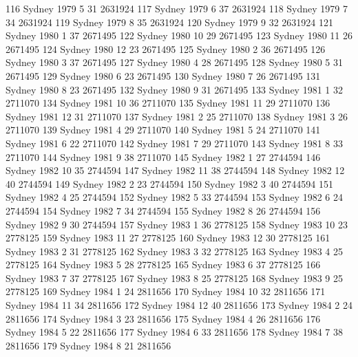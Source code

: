 \documentclass[a4paper]{article}                %
\begin{document}
\begin{Schunk}
\begin{Soutput}
116   Sydney  1979     5      31 2631924
117   Sydney  1979     6      37 2631924
118   Sydney  1979     7      34 2631924
119   Sydney  1979     8      35 2631924
120   Sydney  1979     9      32 2631924
121   Sydney  1980     1      37 2671495
122   Sydney  1980    10      29 2671495
123   Sydney  1980    11      26 2671495
124   Sydney  1980    12      23 2671495
125   Sydney  1980     2      36 2671495
126   Sydney  1980     3      37 2671495
127   Sydney  1980     4      28 2671495
128   Sydney  1980     5      31 2671495
129   Sydney  1980     6      23 2671495
130   Sydney  1980     7      26 2671495
131   Sydney  1980     8      23 2671495
132   Sydney  1980     9      31 2671495
133   Sydney  1981     1      32 2711070
134   Sydney  1981    10      36 2711070
135   Sydney  1981    11      29 2711070
136   Sydney  1981    12      31 2711070
137   Sydney  1981     2      25 2711070
138   Sydney  1981     3      26 2711070
139   Sydney  1981     4      29 2711070
140   Sydney  1981     5      24 2711070
141   Sydney  1981     6      22 2711070
142   Sydney  1981     7      29 2711070
143   Sydney  1981     8      33 2711070
144   Sydney  1981     9      38 2711070
145   Sydney  1982     1      27 2744594
146   Sydney  1982    10      35 2744594
147   Sydney  1982    11      38 2744594
148   Sydney  1982    12      40 2744594
149   Sydney  1982     2      23 2744594
150   Sydney  1982     3      40 2744594
151   Sydney  1982     4      25 2744594
152   Sydney  1982     5      33 2744594
153   Sydney  1982     6      24 2744594
154   Sydney  1982     7      34 2744594
155   Sydney  1982     8      26 2744594
156   Sydney  1982     9      30 2744594
157   Sydney  1983     1      36 2778125
158   Sydney  1983    10      23 2778125
159   Sydney  1983    11      27 2778125
160   Sydney  1983    12      30 2778125
161   Sydney  1983     2      31 2778125
162   Sydney  1983     3      32 2778125
163   Sydney  1983     4      25 2778125
164   Sydney  1983     5      28 2778125
165   Sydney  1983     6      37 2778125
166   Sydney  1983     7      37 2778125
167   Sydney  1983     8      25 2778125
168   Sydney  1983     9      25 2778125
169   Sydney  1984     1      24 2811656
170   Sydney  1984    10      32 2811656
171   Sydney  1984    11      34 2811656
172   Sydney  1984    12      40 2811656
173   Sydney  1984     2      24 2811656
174   Sydney  1984     3      23 2811656
175   Sydney  1984     4      26 2811656
176   Sydney  1984     5      22 2811656
177   Sydney  1984     6      33 2811656
178   Sydney  1984     7      38 2811656
179   Sydney  1984     8      21 2811656

\end{Soutput}
\end{Schunk}
\end{document}
